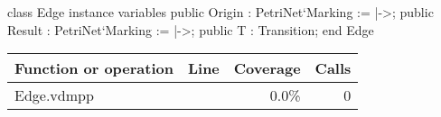 \begin{vdmpp}
class Edge
instance variables
 public Origin : PetriNet`Marking := {|->};
 public Result : PetriNet`Marking := {|->};
 public T : Transition;
end Edge
\end{vdmpp}
\bigskip
\begin{longtable}{|l|r|r|r|}
\hline
Function or operation & Line & Coverage & Calls \\
\hline
\hline
\hline
Edge.vdmpp & & 0.0\% & 0 \\
\hline
\end{longtable}

